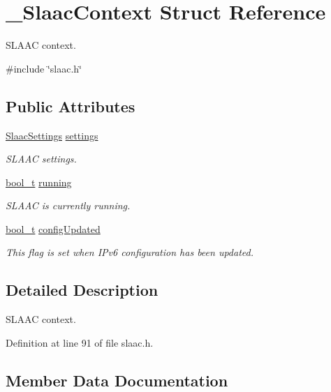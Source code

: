 \hypertarget{struct__SlaacContext}{}\section{\+\_\+\+Slaac\+Context Struct Reference}
\label{struct__SlaacContext}


S\+L\+A\+AC context.  




{\ttfamily \#include \char`\"{}slaac.\+h\char`\"{}}

\subsection*{Public Attributes}
\begin{DoxyCompactItemize}
\item 
\hyperlink{structSlaacSettings}{Slaac\+Settings} \hyperlink{struct__SlaacContext_a6ba3eb35da0958f9a4d2efd9b8fcf9bc}{settings}
\begin{DoxyCompactList}\small\item\em S\+L\+A\+AC settings. \end{DoxyCompactList}\item 
\hyperlink{compiler__port_8h_a812d16e5494522586b3784e55d479912}{bool\+\_\+t} \hyperlink{struct__SlaacContext_a832afcbfe7a7fec6b5f89f060471af92}{running}
\begin{DoxyCompactList}\small\item\em S\+L\+A\+AC is currently running. \end{DoxyCompactList}\item 
\hyperlink{compiler__port_8h_a812d16e5494522586b3784e55d479912}{bool\+\_\+t} \hyperlink{struct__SlaacContext_a77fa1f17f5dc043a84a9b4a0e39d39e1}{config\+Updated}
\begin{DoxyCompactList}\small\item\em This flag is set when I\+Pv6 configuration has been updated. \end{DoxyCompactList}\end{DoxyCompactItemize}


\subsection{Detailed Description}
S\+L\+A\+AC context. 

Definition at line 91 of file slaac.\+h.



\subsection{Member Data Documentation}
\mbox{\label{struct__SlaacContext_a77fa1f17f5dc043a84a9b4a0e39d39e1}} 
